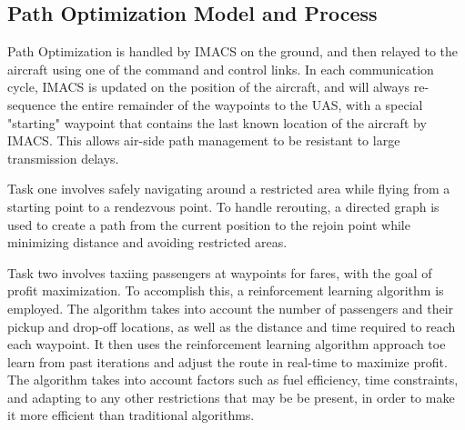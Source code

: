 \subsection{Path Optimization Model and Process}
\label{sec:path-optimization}

Path Optimization is handled by IMACS on the ground, and then relayed to the
aircraft using one of the command and control links. In each communication
cycle, IMACS is updated on the position of the aircraft, and will always
re-sequence the entire remainder of the waypoints to the UAS, with a special
"starting" waypoint that contains the last known location of the aircraft by IMACS.
This allows air-side path management to be resistant to large transmission delays.

Task one involves safely navigating around a restricted area while flying from
a starting point to a rendezvous point. To handle rerouting, a directed graph
is used to create a path from the current position to the rejoin point while
minimizing distance and avoiding restricted areas.

Task two involves taxiing passengers at waypoints for fares, with the goal of
profit maximization. To accomplish this, a reinforcement learning algorithm is
employed. The algorithm takes into account the number of passengers and their
pickup and drop-off locations, as well as the distance and time required to
reach each waypoint. It then uses the reinforcement learning algorithm approach
toe learn from past iterations and adjust the route in real-time to maximize
profit. The algorithm takes into account factors such as fuel efficiency, time
constraints, and adapting to any other restrictions that may be be present, in
order to make it more efficient than traditional algorithms.
